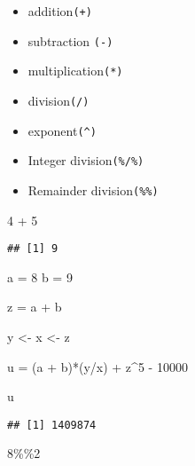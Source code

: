\documentclass[
]{article}
\newenvironment{Shaded}{\begin{snugshade}}{\end{snugshade}}
\newcommand{\DecValTok}[1]{\textcolor[rgb]{0.00,0.00,0.81}{#1}}
\newcommand{\NormalTok}[1]{#1}
\newcommand{\OtherTok}[1]{\textcolor[rgb]{0.56,0.35,0.01}{#1}}
\newcommand{\SpecialCharTok}[1]{\textcolor[rgb]{0.00,0.00,0.00}{#1}}
\providecommand{\tightlist}{%
  \setlength{\itemsep}{0pt}\setlength{\parskip}{0pt}}
\begin{document}
\begin{itemize}
\tightlist
\item
  addition\texttt{(+)}\\
\item
  subtraction \texttt{(-)}\\
\item
  multiplication\texttt{(*)}\\
\item
  division\texttt{(/)}\\
\item
  exponent\texttt{(\^{})}\\
\item
  Integer division\texttt{(\%/\%)}\\
\item
  Remainder division\texttt{(\%\%)}
\end{itemize}

\begin{Shaded}
\begin{Highlighting}[]
\DecValTok{4} \SpecialCharTok{+} \DecValTok{5}
\end{Highlighting}
\end{Shaded}

\begin{verbatim}
## [1] 9
\end{verbatim}

\begin{Shaded}
\begin{Highlighting}[]
\NormalTok{a }\OtherTok{=} \DecValTok{8}
\NormalTok{b }\OtherTok{=} \DecValTok{9}

\NormalTok{z }\OtherTok{=}\NormalTok{ a }\SpecialCharTok{+}\NormalTok{ b}

\NormalTok{y }\OtherTok{\textless{}{-}}\NormalTok{ x }\OtherTok{\textless{}{-}}\NormalTok{ z}

\NormalTok{u }\OtherTok{=}\NormalTok{ (a }\SpecialCharTok{+}\NormalTok{ b)}\SpecialCharTok{*}\NormalTok{(y}\SpecialCharTok{/}\NormalTok{x) }\SpecialCharTok{+}\NormalTok{ z}\SpecialCharTok{\^{}}\DecValTok{5} \SpecialCharTok{{-}} \DecValTok{10000}

\NormalTok{u}
\end{Highlighting}
\end{Shaded}

\begin{verbatim}
## [1] 1409874
\end{verbatim}

\begin{Shaded}
\begin{Highlighting}[]
\DecValTok{8}\SpecialCharTok{\%\%}\DecValTok{2}
\end{Highlighting}
\end{Shaded}
\end{document}
